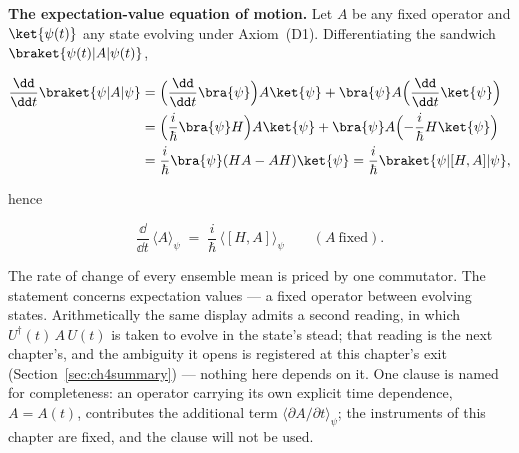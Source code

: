 \textbf{The expectation-value equation of motion.} Let $A$ be any fixed operator and $\ket{\psi(t)}$ any state evolving under Axiom~(D1). Differentiating the sandwich $\braket{\psi(t)|A|\psi(t)}$,
\begin{linenomath}
    \begin{align}
        \frac{\dd}{\dd t}\braket{\psi|A|\psi}
        &= \Bigl(\frac{\dd}{\dd t}\bra{\psi}\Bigr)A\ket{\psi}
           + \bra{\psi}A\Bigl(\frac{\dd}{\dd t}\ket{\psi}\Bigr) \nonumber\\
        &= \Bigl(\frac{i}{\hbar}\bra{\psi}H\Bigr)A\ket{\psi}
           + \bra{\psi}A\Bigl(-\frac{i}{\hbar}H\ket{\psi}\Bigr) \nonumber\\
        &= \frac{i}{\hbar}\bra{\psi}(HA - AH)\ket{\psi}
         = \frac{i}{\hbar}\braket{\psi|[H,A]|\psi},
    \end{align}
\end{linenomath}
hence
\begin{linenomath}
    \begin{equation}
        \frac{\dd}{\dd t}\,\langle A\rangle_\psi \;=\; \frac{i}{\hbar}\,\bigl\langle [H,A] \bigr\rangle_\psi
        \qquad (A\ \text{fixed}) .
        \label{eq:expectation-eom}
    \end{equation}
\end{linenomath}
The rate of change of every ensemble mean is priced by one commutator. The statement concerns expectation values --- a fixed operator between evolving states. Arithmetically the same display admits a second reading, in which $U^\dagger(t)\,A\,U(t)$ is taken to evolve in the state's stead; that reading is the next chapter's, and the ambiguity it opens is registered at this chapter's exit (Section~\ref{sec:ch4summary}) --- nothing here depends on it. One clause is named for completeness: an operator carrying its own explicit time dependence, $A = A(t)$, contributes the additional term $\langle\partial A/\partial t\rangle_\psi$; the instruments of this chapter are fixed, and the clause will not be used.


